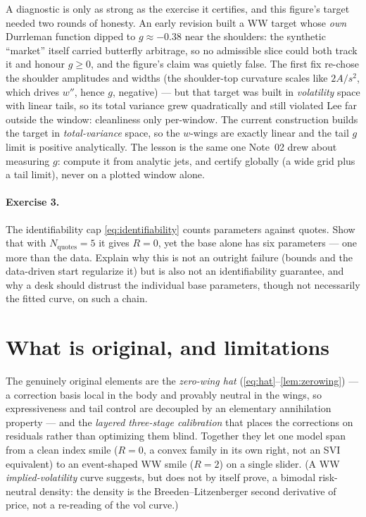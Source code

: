 \documentclass[11pt]{article}
\begin{document}
\begin{remark}
\label{rem:targetbug}
A diagnostic is only as strong as the exercise it certifies, and this figure's
target needed two rounds of honesty.  An early revision built a WW target whose
\emph{own} Durrleman function dipped to $g\approx-0.38$ near the shoulders: the
synthetic ``market'' itself carried butterfly arbitrage, so no admissible slice
could both track it and honour $g\ge0$, and the figure's claim was quietly
false.  The first fix re-chose the shoulder amplitudes and widths (the
shoulder-top curvature scales like $2A/s^2$, which drives $w''$, hence $g$,
negative) --- but that target was built in \emph{volatility} space with linear
tails, so its total variance grew quadratically and still violated Lee far
outside the window: cleanliness only per-window.  The current construction
builds the target in \emph{total-variance} space, so the $w$-wings are exactly
linear and the tail $g$ limit is positive analytically.  The lesson is the same
one Note~02 drew about measuring $g$: compute it from analytic jets, and certify
globally (a wide grid plus a tail limit), never on a plotted window alone.
\end{remark}

\paragraph{Exercise 3.}
The identifiability cap \eqref{eq:identifiability} counts parameters against
quotes.  Show that with $N_{\mathrm{quotes}}=5$ it gives $R=0$, yet the base
alone has six parameters --- one more than the data.  Explain why this is not an
outright failure (bounds and the data-driven start regularize it) but is also
not an identifiability guarantee, and why a desk should distrust the individual
base parameters, though not necessarily the fitted curve, on such a chain.

\section{What is original, and limitations}
\label{sec:original}

The genuinely original elements are the \emph{zero-wing hat}
(\eqref{eq:hat}--\cref{lem:zerowing}) --- a correction basis local in the body
and provably neutral in the wings, so expressiveness and tail control are
decoupled by an elementary annihilation property --- and the \emph{layered
three-stage calibration} that places the corrections on residuals rather than
optimizing them blind.  Together they let one model span from a clean index
smile ($R=0$, a convex family in its own right, not an SVI equivalent) to an
event-shaped WW smile ($R=2$) on a single slider.  (A WW \emph{implied-volatility}
curve suggests, but does not by itself prove, a bimodal risk-neutral density:
the density is the Breeden--Litzenberger second derivative of price, not a
re-reading of the vol curve.)
\end{document}
